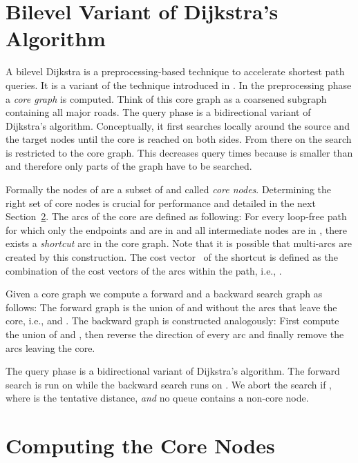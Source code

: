 \documentclass{sig-alternate}
\begin{document}
\section{Bilevel Variant of Dijkstra's Algorithm}\label{sec:Bilevel-Dijkstra}


A bilevel Dijkstra is a preprocessing-based technique to accelerate
shortest path queries. It is a variant of the technique introduced
in \cite{sww-daola-00}. In the preprocessing phase a \emph{core graph}
 is computed. Think of this core graph as a
coarsened subgraph containing all major roads. The query phase is a bidirectional
variant of Dijkstra's algorithm. Conceptually, it first searches locally around
the source and the target nodes until the core is reached on both
sides. From there on the search is restricted to the core graph.
This decreases query times because  is smaller than  and
therefore only parts of the graph have to be searched.

Formally the nodes  of  are a subset of  and called
\emph{core nodes}. Determining the right set of core nodes is crucial
for performance and detailed in the next Section~\ref{sec:core}.
The arcs of the core are defined as following: For every loop-free path 
for which only the endpoints  and  are in  and all intermediate nodes
are in , there exists a \emph{shortcut} arc 
in the core graph. Note that it is possible that multi-arcs are created
by this construction. The cost vector~ of the shortcut is defined
as the combination of the cost vectors of the arcs within
the path, i.e., .

Given a core graph we compute a forward and a backward search graph
as follows: The forward graph  is the union of  and
 without the arcs  that leave the core, i.e., 
and . The backward graph  is constructed
analogously: First compute the union of  and ,
then reverse the direction of every arc and finally remove the arcs
leaving the core.

The query phase is a bidirectional variant of Dijkstra's algorithm.
The forward search is run on  while the backward search runs
on . We abort the search if , where 
is the tentative distance, \emph{and} no queue contains a non-core node.


\section{Computing the Core Nodes}\label{sec:core}
\end{document}
